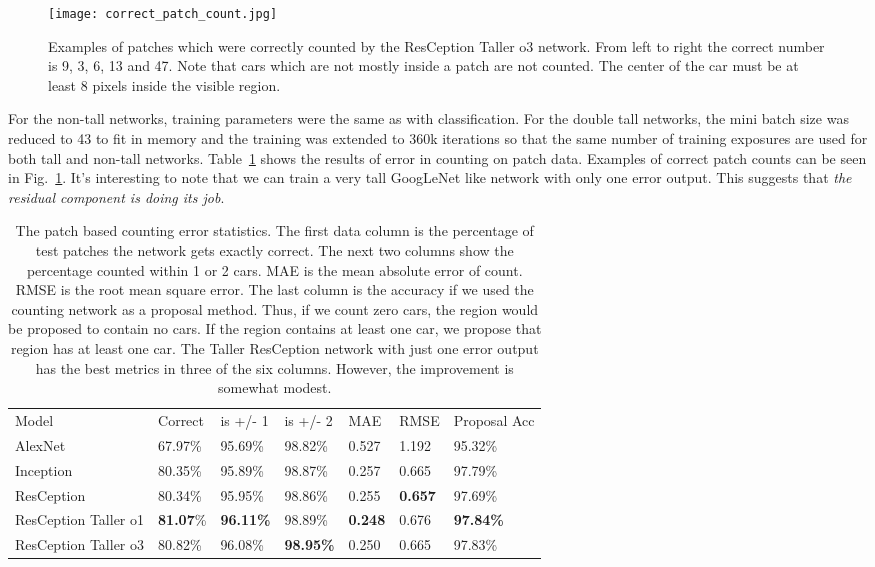 \documentclass[runningheads]{llncs}
\begin{document}
\begin{figure}
\centering
\texttt{[image: correct\_patch\_count.jpg]}
\caption{ Examples of patches which were correctly counted by the ResCeption Taller o3 network. From left to right the correct number is 9, 3, 6, 13 and 47. Note that cars which are not mostly inside a patch are not counted. The center of the car must be at least 8 pixels inside the visible region. }
\label{fig:correct_patch_count}
\end{figure}

For the non-tall networks, training parameters were the same as with classification. For the double tall networks, the mini batch size was reduced to 43 to fit in memory and the training was extended to 360k iterations so that the same number of training exposures are used for both tall and non-tall networks. Table~\ref{table:count_patch} shows the results of error in counting on patch data. Examples of correct patch counts can be seen in Fig.~\ref{fig:correct_patch_count}. It's interesting to note that we can train a very tall GoogLeNet like network with only one error output. This suggests that {\it the residual component is doing its job}. 

\setlength{\tabcolsep}{4pt}
\begin{table}
\begin{center}
\caption{ The patch based counting error statistics.  The first data column is the percentage of test patches the network gets exactly correct. The next two columns show the percentage counted within 1 or 2 cars. MAE is the mean absolute error of count. RMSE is the root mean square error. The last column is the accuracy if we used the counting network as a proposal method. Thus, if we count zero cars, the region would be proposed to contain no cars. If the region contains at least one car, we propose that region has at least one car. The Taller ResCeption network with just one error output has the best metrics in three of the six columns. However, the improvement is somewhat modest. }
\label{table:count_patch}
\begin{tabular}{lllllll}
\hline\noalign{\smallskip}
Model & Correct & is +/- 1 & is +/- 2 & MAE & RMSE & Proposal Acc\\
\noalign{\smallskip}
\hline
\noalign{\smallskip}
AlexNet & 67.97\% & 95.69\% & 98.82\% & 0.527 & 1.192 & 95.32\%\\
Inception & 80.35\% & 95.89\% & 98.87\% & 0.257 & 0.665 & 97.79\%\\
ResCeption & 80.34\% & 95.95\% & 98.86\% & 0.255 & {\bf 0.657} & 97.69\%\\
ResCeption Taller o1 & {\bf 81.07}\% & {\bf 96.11\%} & 98.89\% & {\bf 0.248} & 0.676 & {\bf 97.84\%}\\
ResCeption Taller o3 & 80.82\% & 96.08\% & {\bf 98.95\%} & 0.250 & 0.665 & 97.83\%\\
\hline
\end{tabular}
\end{center}
\end{table}
\setlength{\tabcolsep}{1.4pt}
\end{document}
